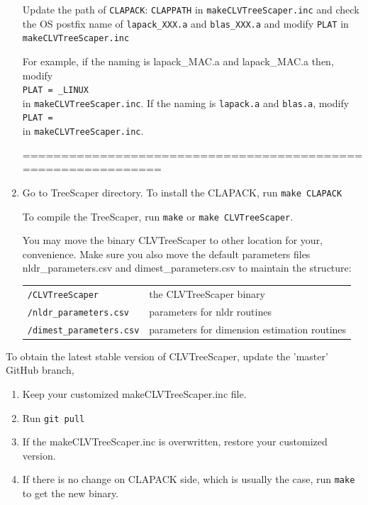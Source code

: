 \documentclass[11pt]{article}
\begin{document}
\begin{enumerate}[(1)]
		
		
		
		Update the path of \texttt{CLAPACK}:
		\texttt{CLAPPATH} in \texttt{makeCLVTreeScaper.inc}
		and check the OS postfix name of \texttt{lapack\_XXX.a} and \texttt{blas\_XXX.a} and modify
		\texttt{PLAT} in \texttt{makeCLVTreeScaper.inc}
		
		For example, if the naming is lapack\_MAC.a and lapack\_MAC.a then, modify\\
		\texttt{PLAT = \_LINUX}\\
		in \texttt{makeCLVTreeScaper.inc}. If the naming is \texttt{lapack.a} and \texttt{blas.a}, modify\\
		\texttt{PLAT =}\\
		in \texttt{makeCLVTreeScaper.inc}.
		
		==============================================================
		
		\item Go to TreeScaper directory. To install the CLAPACK,
		run \texttt{make CLAPACK}
		
		To compile the TreeScaper, run \texttt{make} or \texttt{make CLVTreeScaper}.
		
		You may move the binary CLVTreeScaper to other location for your,
		convenience. Make sure you also move the default parameters files 
		nldr\_parameters.csv and dimest\_parameters.csv to maintain the structure:
		
		\begin{table}[!h]
			\begin{tabular}{ll}
				\texttt{/CLVTreeScaper}           &the CLVTreeScaper binary\\
				\texttt{/nldr\_parameters.csv}    &parameters for nldr routines\\
				\texttt{/dimest\_parameters.csv}  &parameters for dimension estimation routines\\
			\end{tabular}
		\end{table} 
		
		
	\end{enumerate}
	
	
	
	

	To obtain the latest stable version of CLVTreeScaper, update the 'master' GitHub branch,
	\begin{enumerate}[1)]
		\item Keep your customized makeCLVTreeScaper.inc file.
		\item  Run \texttt{git pull}
		\item If the makeCLVTreeScaper.inc is overwritten, restore your
		customized version.
		\item If there is no change on CLAPACK side, which is usually the case,
		run \texttt{make} to get the new binary.
	\end{enumerate}
	
\end{document}
